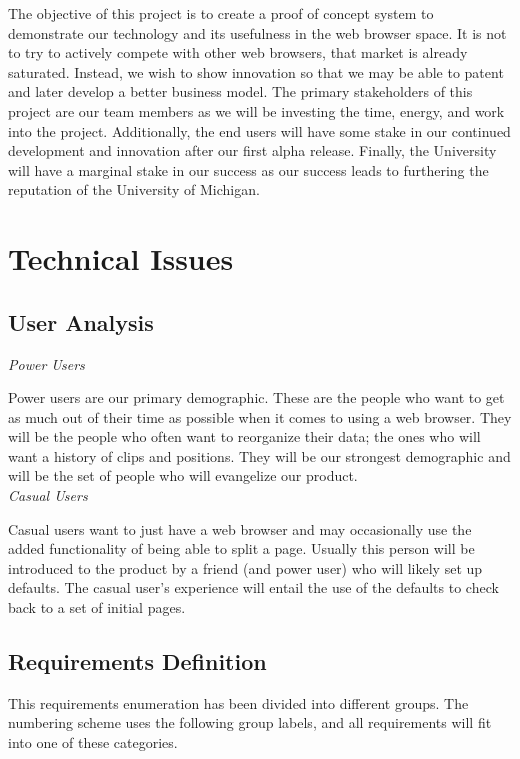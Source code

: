 \documentclass[12pt]{article}
\begin{document}
The objective of this project is to create a proof of concept system to demonstrate our technology and its usefulness in the web browser space. It is not to try to actively compete with other web browsers, that market is already saturated. Instead, we wish to show innovation so that we may be able to patent and later develop a better business model. The primary stakeholders of this project are our team members as we will be investing the time, energy, and work into the project. Additionally, the end users will have some stake in our continued development and innovation after our first alpha release. Finally, the University will have a marginal stake in our success as our success leads to furthering the reputation of the University of Michigan.
\section{Technical Issues} %
\label{sec:technical_issues}
\subsection{User Analysis} %
\label{sub:user_analysis}
\emph{Power Users}

Power users are our primary demographic. These are the people who want to get as much out of their time as possible when it comes to using a web browser. They will be the people who often want to reorganize their data; the ones who will want a history of clips and positions. They will be our strongest demographic and will be the set of people who will evangelize our product. \\

\emph{Casual Users}

Casual users want to just have a web browser and may occasionally use the added functionality of being able to split a page. Usually this person will be introduced to the product by a friend (and power user) who will likely set up defaults. The casual user's experience will entail the use of the defaults to check back to a set of initial pages.

\subsection{Requirements Definition} %
\label{sub:requirements_definition}
This requirements enumeration has been divided into different groups. The numbering scheme uses the following group labels, and all requirements will fit into one of these categories. \\
\end{document}
